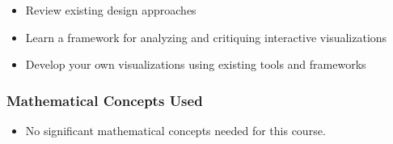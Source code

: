 {\begin{highlight}[\CSPBIV]
        \begin{itemize}
            \item Review existing design approaches
            \item Learn a framework for analyzing and critiquing interactive visualizations
            \item Develop your own visualizations using existing tools and frameworks
        \end{itemize}
        
        \subsubsection*{Mathematical Concepts Used}
    
        \begin{itemize}
            \item No significant mathematical concepts needed for this course.
        \end{itemize}
    \end{highlight}
}